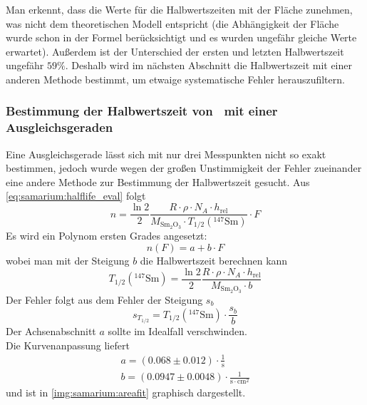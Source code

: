 Man erkennt, dass die Werte für die Halbwertszeiten mit der Fläche zunehmen, was nicht dem theoretischen Modell entspricht (die Abhängigkeit der 
Fläche wurde schon in der Formel berücksichtigt und es wurden ungefähr gleiche Werte erwartet). Außerdem ist der Unterschied der ersten und letzten 
Halbwertszeit ungefähr $59\%$. Deshalb wird im nächsten Abschnitt die Halbwertszeit mit einer anderen Methode bestimmt, 
um etwaige systematische Fehler herauszufiltern.

\subsubsection{Bestimmung der Halbwertszeit von \samarium ~mit einer Ausgleichsgeraden}
Eine Ausgleichsgerade lässt sich mit nur drei Messpunkten nicht so exakt bestimmen, jedoch wurde wegen der großen Unstimmigkeit der Fehler 
zueinander eine andere Methode zur Bestimmung der Halbwertszeit gesucht.
Aus \autoref{eq:samarium:halflife_eval} folgt
\begin{equation}
   n = \frac{\ln 2}{2} \frac{R \cdot \rho \cdot N_A \cdot h_{\text{rel}}}{M_{\text{Sm}_2\text{O}_3} \cdot T_{1/2}({}^{147}\text{Sm})} \cdot F
\end{equation}
Es wird ein Polynom ersten Grades angesetzt:
\begin{equation}
  n(F) = a + b \cdot F
\end{equation}
wobei man mit der Steigung $b$ die Halbwertszeit berechnen kann
\begin{equation}
  T_{1/2}({}^{147}\text{Sm}) = \frac{\ln 2}{2} \frac{R \cdot \rho \cdot N_A \cdot h_{\text{rel}}}{M_{\text{Sm}_2\text{O}_3} \cdot b}
\end{equation}
Der Fehler folgt aus dem Fehler der Steigung $s_b$
\begin{equation}
  s_{T_{1/2}} = T_{1/2}({}^{147}\text{Sm}) \cdot \frac{s_b}{b}
\end{equation}
Der Achsenabschnitt $a$ sollte im Idealfall verschwinden. \\
Die Kurvenanpassung liefert
\begin{gather}
  a = (0.068  \pm 0.012 ) \cdot \frac{1}{\text{s}} \\
  b = (0.0947 \pm 0.0048) \cdot \frac{1}{\text{s}\cdot \text{cm}^2}
\end{gather}
und ist in \autoref{img:samarium:areafit} graphisch dargestellt. 
